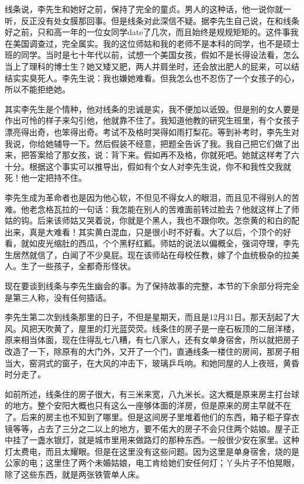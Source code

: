 线条说，李先生和她好之前，保持了完全的童贞。男人的这种话，他一说你就一听，反正没有处女膜那回事。但是线条对此深信不疑。据李先生自己说，在和线条好之前，只和高一年的一位女同学date了几次，而且始终是规规矩矩的。这件事我在美国调查过，完全属实。我的这位师姑和我的老师不是本科的同学，也不是硕士班的同学。当时是七十年代以前，试想一个美国女孩，假如不是长得设法看，怎么当上了理科的博士生？她又矮又肥，两人并肩坐时，还会放出肥人的屁来，可以结结实实臭死人。李先生说：我也嫌她难看。但我怎么也不忍伤了一个女孩子的心，所以不能拒绝她。 

其实李先生是个情种，他对线条的忠诚是实，我不便加以诋毁。但是别的女人要是作出可怜的样子来勾引他，他就靠不住了。我知道他教的研究生班里，有个女孩子漂亮得出奇，也笨得出奇。考试不及格时哭得如雨打梨花。等到补考时，李先生对我说，你给她辅导一下。然后假装不经意，把题全告诉了我。我自己把它们做了出来，把答案给了那女孩，说：背下来。假如再不及格，你就死吧。她就这样考了六十分。根据这个事实可以推导出，假如有个女人对李先生说，你不和我性交我就死！他一定把持不住。 

李先生成为革命者也是因为他心软，不但见不得女人的眼泪，而且见不得别人的苦难。他老念格瓦拉的一句话：我怎能在别人的苦难面前转过脸去？他就这样上了师姑的钩。后来该师姑又哭着说，你就是个黑人，我也不跟你吹。怎奈黄的和白的配出来，真是大难看！其实黄白混血，只是很小时不好看。大了以后，个顶个的好看，就如皮光缩肚的西瓜，个个黑籽红瓤。师姑的说法以偏概全，强词夺理，李先生居然就信了，白闻了不少臭屁。现在该师站在母校任教，嫁了个血统极杂的拉美人。生了一些孩子，全都奇形怪状。 

现在要谈到线条与李先生幽会的事。为了保持故事的完整，本节的下余部分将完全是第三人称，没有任何插话。 

李先生第二次到线条那里的日子，不但是星期天，而且是12月31日。那天刮起了大风。风把天吹黄了，屋里的灯光蓝荧荧。线条住的房子是一座石板顶的二层洋楼，原来相当体面，现在住得乱七八糟，有七八家人，还有女单身宿舍，所以就把房子改造了一下，除原有的大门外，又开了一个门，直通线条一楼住的房间，那房子相当大，窑洞式的窗子，在大风的冲击下，玻璃乒乓响。和她同屋的人上夜班，黄昏时分走了。 

如前所述，线条住的房子很大，有三米来宽，八九米长。这大概是原来房主打台球的地方。整个安阳大概也只有这么一座够体面的洋房，但是原来的房主早就不在了。后来的房主也不知到了哪里。但是这间房子里堆着他们的东西，箱子柜子穿衣镜等等，占去了三分之二以上的地方，要不偌大的房子不会只住两个姑娘。屋子正中挂了一盏水银灯，就是城市里用来做路灯的那种东西。一般很少安在家里。这种灯太费电，而且太耀眼。但是在这里没有这些问题。因为这里是单身宿舍，烧的是公家的电；这里住了两个未婚姑娘，电工肯给她们安任何灯；丫头片子不怕晃眼，除了这些东西，就是两张铁管单人床。 

